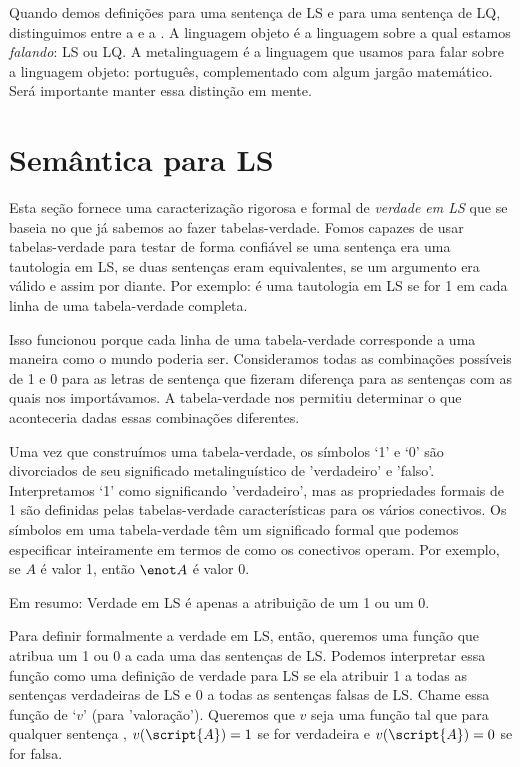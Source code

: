 Quando demos definições para uma sentença de LS e para uma sentença de LQ, distinguimos entre a  e a . A linguagem objeto é a linguagem sobre a qual estamos \emph{falando}: LS ou LQ. A metalinguagem é a linguagem que usamos para falar sobre a linguagem objeto: português, complementado com algum jargão matemático. Será importante manter essa distinção em mente.

\section{Semântica para LS}

Esta seção fornece uma caracterização rigorosa e formal de \emph{verdade em LS} que se baseia no que já sabemos ao fazer tabelas-verdade. Fomos capazes de usar tabelas-verdade para testar de forma confiável se uma sentença era uma tautologia em LS, se duas sentenças eram equivalentes, se um argumento era válido e assim por diante. Por exemplo:  é uma tautologia em LS se for 1 em cada linha de uma tabela-verdade completa.

Isso funcionou porque cada linha de uma tabela-verdade corresponde a uma maneira como o mundo poderia ser. Consideramos todas as combinações possíveis de 1 e 0 para as letras de sentença que fizeram diferença para as sentenças com as quais nos importávamos. A tabela-verdade nos permitiu determinar o que aconteceria dadas essas combinações diferentes.

Uma vez que construímos uma tabela-verdade, os símbolos `1' e `0' são divorciados de seu significado metalinguístico de 'verdadeiro' e 'falso'. Interpretamos `1' como significando 'verdadeiro', mas as propriedades formais de 1 são definidas pelas tabelas-verdade características para os vários conectivos. Os símbolos em uma tabela-verdade têm um significado formal que podemos especificar inteiramente em termos de como os conectivos operam. Por exemplo, se $A$ é valor 1, então $\enot A$ é valor 0.

Em resumo: Verdade em LS é apenas a atribuição de um 1 ou um 0.

Para definir formalmente a verdade em LS, então, queremos uma função que atribua um 1 ou 0 a cada uma das sentenças de LS. Podemos interpretar essa função como uma definição de verdade para LS se ela atribuir 1 a todas as sentenças verdadeiras de LS e 0 a todas as sentenças falsas de LS. Chame essa função de `$v$' (para 'valoração'). Queremos que $v$ seja uma função tal que para qualquer sentença , $v(\script{A})=1$ se  for verdadeira e $v(\script{A})=0$ se  for falsa.

